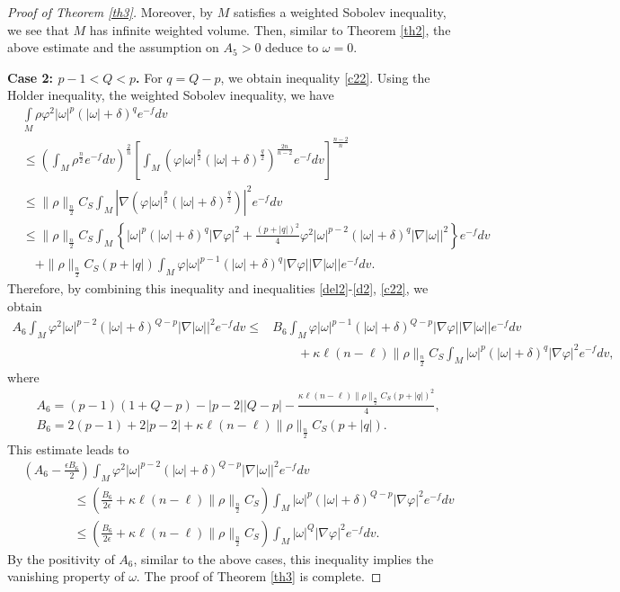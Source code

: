 \documentclass[leqno,12pt]{article} %
\theoremstyle{plain} %
\theoremstyle{definition} %
\numberwithin{equation}{section}
\begin{document}
\begin{proof}[Proof of Theorem \ref{th3}]
	Moreover, by $M$ satisfies a weighted Sobolev inequality, we see that $M$ has infinite weighted volume. Then, similar to Theorem \ref{th2}, the above estimate and the assumption on $A_5>0$ deduce to $\omega=0$.
	
	\textbf{Case 2: $p-1<Q<p$.} For $q=Q-p$, we obtain inequality \eqref{c22}. Using the Holder inequality, the weighted Sobolev inequality, we have
	\begin{align*}
				&\int\limits_M \rho\varphi ^2|\omega |^{p}(|\omega|+\delta)^q e^{-f}dv\\
				&\le \left(\int_M \rho^{\frac{n}{2}}e^{-f}dv\right)^{\frac{2}{n}} \left[ \int_M \left(\varphi |\omega|^{\frac{p}{2}}(|\omega|+\delta)^{\frac{q}{2}}\right)^{\frac{2n}{n-2}}e^{-f}dv \right]^{\frac{n-2}{n}}\\
		&\le \|\rho\|_{\frac{n}{2}} C_S  \int_M \left|\nabla \left( \varphi |\omega|^{\frac{p}{2}}(|\omega|+\delta)^{\frac{q}{2}} \right)\right|^2 e^{-f}dv\\
			&\le \|\rho\|_{\frac{n}{2}} C_S  \int_M \left\{ |\omega|^p (|\omega|+\delta)^q |\nabla \varphi|^2 +\frac{(p+|q|)^2}{4}\varphi^2 |\omega|^{p-2}(|\omega|+\delta)^{q} |\nabla |\omega||^2  \right\}e^{-f}dv\\
			&\quad + \|\rho\|_{\frac{n}{2}} C_S(p+|q|)\int_M \varphi |\omega|^{p-1} (|\omega|+\delta)^{q} |\nabla \varphi| |\nabla |\omega|| e^{-f}dv.
	\end{align*}
	Therefore, by combining this inequality and inequalities \eqref{del2}-\eqref{d2}, \eqref{c22}, we obtain
		\begin{align*}\nonumber
		A_6 \int_M \varphi^2 |\omega|^{p-2} (|\omega|+\delta)^{Q-p}|\nabla|\omega||^2 e^{-f}dv \le &B_6 \int_M \varphi |\omega|^{p-1} (|\omega|+\delta)^{Q-p}|\nabla \varphi||\nabla|\omega||e^{-f}dv\\
		&\qquad +\kappa \ell (n-\ell)\|\rho\|_{\frac{n}{2}} C_S\int_M |\omega|^p (|\omega|+\delta)^q |\nabla \varphi|^2 e^{-f}dv,
	\end{align*}
	where
	\begin{align*}
		&A_6=(p-1)(1+Q-p)-|p-2||Q-p|-\frac{\kappa \ell (n-\ell)\|\rho\|_{\frac{n}{2}} C_S(p+|q|)^2}{4},\\
		&B_6=2(p-1)+2|p-2|+\kappa \ell (n-\ell)\|\rho\|_{\frac{n}{2}} C_S(p+|q|).
	\end{align*}
	This estimate leads to
		\begin{align}\nonumber
		&\left(A_6-\frac{\epsilon B_6}{2}\right) \int_M \varphi^2 |\omega|^{p-2}(|\omega|+\delta)^{Q-p}|\nabla|\omega||^2 e^{-f}dv \\ \nonumber
		&\qquad\qquad\le \left( \frac{B_6}{2\epsilon}+\kappa \ell (n-\ell) \|\rho\|_{\frac{n}{2}} C_S\right)\int_M |\omega|^{p} (|\omega|+\delta)^{Q-p}|\nabla \varphi|^2e^{-f}dv\\ \nonumber
		&\qquad\qquad\le \left( \frac{B_6}{2\epsilon}+\kappa \ell (n-\ell)\|\rho\|_{\frac{n}{2}} C_S \right) \int_M |\omega|^{Q} |\nabla \varphi|^2e^{-f}dv.
	\end{align}
	By the positivity of $ A_6$, similar to the above cases, this inequality implies the vanishing property of $\omega$. The proof of Theorem \ref{th3} is complete.
\end{proof}
\end{document}
